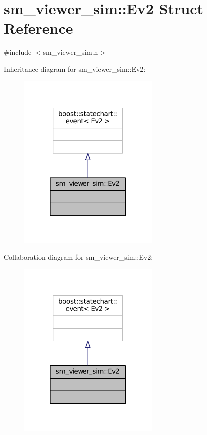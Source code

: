 \hypertarget{structsm__viewer__sim_1_1Ev2}{}\section{sm\+\_\+viewer\+\_\+sim\+:\+:Ev2 Struct Reference}
\label{structsm__viewer__sim_1_1Ev2}


{\ttfamily \#include $<$sm\+\_\+viewer\+\_\+sim.\+h$>$}



Inheritance diagram for sm\+\_\+viewer\+\_\+sim\+:\+:Ev2\+:
\nopagebreak
\begin{figure}[H]
\begin{center}
\leavevmode
\includegraphics[width=193pt]{structsm__viewer__sim_1_1Ev2__inherit__graph}
\end{center}
\end{figure}


Collaboration diagram for sm\+\_\+viewer\+\_\+sim\+:\+:Ev2\+:
\nopagebreak
\begin{figure}[H]
\begin{center}
\leavevmode
\includegraphics[width=193pt]{structsm__viewer__sim_1_1Ev2__coll__graph}
\end{center}
\end{figure}


